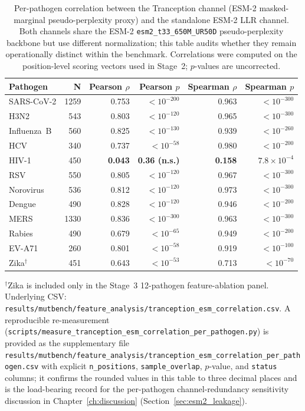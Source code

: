 \begin{table}[htbp]
\centering
\caption{Per-pathogen correlation between the Tranception channel (ESM-2 masked-marginal pseudo-perplexity proxy) and the standalone ESM-2 LLR channel. Both channels share the ESM-2 \texttt{esm2\_t33\_650M\_UR50D} pseudo-perplexity backbone but use different normalization; this table audits whether they remain operationally distinct within the benchmark. Correlations were computed on the position-level scoring vectors used in Stage~2; $p$-values are uncorrected.}
\label{subsubsec:tranception_separation}
\label{tab:tranception_esm_correlation}
\footnotesize
\begin{tabular}{lrrrrr}
\toprule
\textbf{Pathogen} & \textbf{N} & \textbf{Pearson $\rho$} & \textbf{Pearson $p$} & \textbf{Spearman $\rho$} & \textbf{Spearman $p$} \\
\midrule
SARS-CoV-2     & 1259 & 0.753 & $< 10^{-200}$ & 0.963 & $< 10^{-300}$ \\
H3N2           &  543 & 0.803 & $< 10^{-120}$ & 0.965 & $< 10^{-300}$ \\
Influenza~B    &  560 & 0.825 & $< 10^{-130}$ & 0.939 & $< 10^{-260}$ \\
HCV            &  340 & 0.737 & $< 10^{-58}$  & 0.980 & $< 10^{-200}$ \\
HIV-1          &  450 & \textbf{0.043} & \textbf{0.36 (n.s.)} & \textbf{0.158} & $7.8 \times 10^{-4}$ \\
RSV            &  550 & 0.805 & $< 10^{-120}$ & 0.967 & $< 10^{-300}$ \\
Norovirus      &  536 & 0.812 & $< 10^{-120}$ & 0.973 & $< 10^{-300}$ \\
Dengue         &  490 & 0.828 & $< 10^{-120}$ & 0.946 & $< 10^{-200}$ \\
MERS           & 1330 & 0.836 & $< 10^{-300}$ & 0.963 & $< 10^{-300}$ \\
Rabies         &  490 & 0.679 & $< 10^{-65}$  & 0.949 & $< 10^{-200}$ \\
EV-A71         &  260 & 0.801 & $< 10^{-58}$  & 0.919 & $< 10^{-100}$ \\
Zika$^{\dagger}$ &  451 & 0.643 & $< 10^{-53}$  & 0.713 & $< 10^{-70}$  \\
\bottomrule
\end{tabular}
\begin{minipage}{\textwidth}
\smallskip
\footnotesize $^{\dagger}$Zika is included only in the Stage~3 12-pathogen feature-ablation panel. Underlying CSV: \texttt{results/mutbench/feature\_analysis/tranception\_esm\_correlation.csv}. A reproducible re-measurement (\texttt{scripts/measure\_tranception\_esm\_correlation\_per\_pathogen.py}) is provided as the supplementary file \texttt{results/mutbench/feature\_analysis/tranception\_esm\_correlation\_per\_pathogen.csv} with explicit \texttt{n\_positions}, \texttt{sample\_overlap}, $p$-value, and \texttt{status} columns; it confirms the rounded values in this table to three decimal places and is the load-bearing record for the per-pathogen channel-redundancy sensitivity discussion in Chapter~\ref{ch:discussion} (Section~\ref{sec:esm2_leakage}).
\end{minipage}
\end{table}
